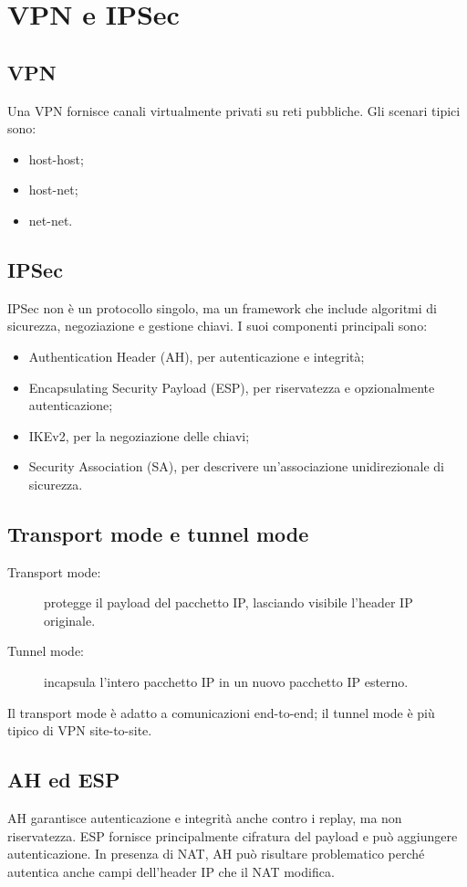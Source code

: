 \documentclass[12pt, a4paper]{report}
\begin{document}
\section{VPN e IPSec}

\subsection{VPN}
Una VPN fornisce canali virtualmente privati su reti pubbliche. Gli scenari tipici sono:
\begin{itemize}
	\item host-host;
	\item host-net;
	\item net-net.
\end{itemize}

\subsection{IPSec}
IPSec non \`e un protocollo singolo, ma un framework che include algoritmi di sicurezza, negoziazione e gestione chiavi. I suoi componenti principali sono:
\begin{itemize}
	\item Authentication Header (AH), per autenticazione e integrit\`a;
	\item Encapsulating Security Payload (ESP), per riservatezza e opzionalmente autenticazione;
	\item IKEv2, per la negoziazione delle chiavi;
	\item Security Association (SA), per descrivere un'associazione unidirezionale di sicurezza.
\end{itemize}

\subsection{Transport mode e tunnel mode}
\begin{description}
	\item[Transport mode:] protegge il payload del pacchetto IP, lasciando visibile l'header IP originale.
	\item[Tunnel mode:] incapsula l'intero pacchetto IP in un nuovo pacchetto IP esterno.
\end{description}
Il transport mode \`e adatto a comunicazioni end-to-end; il tunnel mode \`e pi\`u tipico di VPN site-to-site.

\subsection{AH ed ESP}
AH garantisce autenticazione e integrit\`a anche contro i replay, ma non riservatezza. ESP fornisce principalmente cifratura del payload e pu\`o aggiungere autenticazione. In presenza di NAT, AH pu\`o risultare problematico perch\'e autentica anche campi dell'header IP che il NAT modifica.
\end{document}
